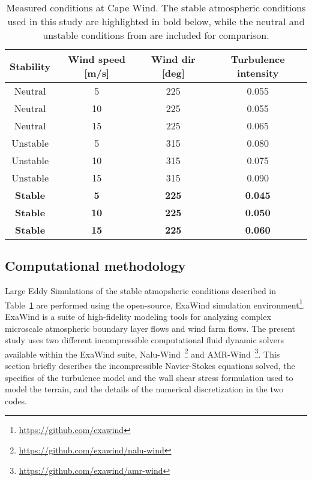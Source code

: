 \begin{table}
\caption{\label{tab:CapeWindMeasurements} Measured conditions at Cape
  Wind.  The stable atmospheric conditions used in this study are
  highlighted in bold below, while the neutral and unstable conditions
  from \cite{cheung2020large} are included for comparison.} \centering
\begin{tabular}{cccc}
  \hline
  Stability    & Wind speed [m/s] & Wind dir [deg] & Turbulence intensity \\
  \hline
  Neutral      & 5                & 225            & 0.055           \\
  Neutral      & 10               & 225            & 0.055           \\
  Neutral      & 15               & 225            & 0.065           \\
  Unstable     & 5                & 315            & 0.080           \\
  Unstable     & 10               & 315            & 0.075           \\
  Unstable     & 15               & 315            & 0.090           \\
  \bf{Stable}  & \bf{5}           & \bf{225}       & \bf{0.045}      \\
  \bf{Stable}  & \bf{10}          & \bf{225}       & \bf{0.050}      \\
  \bf{Stable}  & \bf{15}          & \bf{225}       & \bf{0.060}      \\
\hline
\end{tabular}
\end{table}


\subsection{Computational methodology}

Large Eddy Simulations of the stable atmopsheric conditions described in
Table~\ref{tab:CapeWindMeasurements} are performed using the open-source,
ExaWind simulation environment\footnote{\url{https://github.com/exawind}}.
ExaWind is a suite of high-fidelity modeling tools for analyzing complex
microscale atmospheric boundary layer flows and wind farm flows. The present
study uses two different incompressible computational fluid dynamic solvers
available within the ExaWind suite,
Nalu-Wind~\footnote{\url{https://github.com/exawind/nalu-wind}} and
AMR-Wind~\footnote{\url{https://github.com/exawind/amr-wind}}. This section
briefly describes the incompressible Navier-Stokes equations solved,
the specifics of the turbulence model and the wall shear stress
formulation used to model the terrain, and the details of the numerical
discretization in the two codes.

